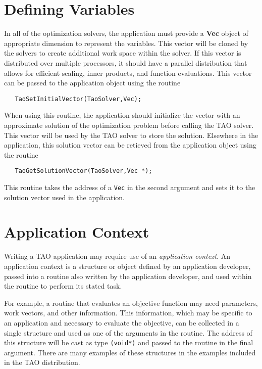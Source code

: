 \section{Defining Variables}
In all of the optimization solvers, the application must provide
a {\bf Vec} object of appropriate dimension to represent the variables.
This vector will be cloned by the solvers to create additional work
space within the solver.
If this vector is distributed over multiple processors, it
should have a parallel distribution that allows
for efficient scaling, inner products, and
function evaluations.  This vector can be passed to the
application object using the routine 
\begin{verbatim}
   TaoSetInitialVector(TaoSolver,Vec);
\end{verbatim}
When using this routine, the application should initialize the vector with
an approximate solution of the optimization problem before calling the
TAO solver.
This vector will be used by the TAO solver to store the solution.
Elsewhere in the application, 
this solution vector can be retieved from the application object 
using the routine 
\begin{verbatim}
   TaoGetSolutionVector(TaoSolver,Vec *);
\end{verbatim}
This routine takes the address of a {\tt Vec} in the second argument and sets it to
the solution vector used in the application.

\section{Application Context}  
Writing a TAO application may require
use of an {\em application context}.
An application context is a structure or object defined by an
application developer, passed
into a routine also written by the application developer, 
and used within the routine to perform its stated task.
 
For example, a routine that evaluates an objective function may need
parameters, work vectors, and other information.   This information,
which may be specific to an application and necessary to evaluate the objective,
can be collected in a single structure and used as one of the
arguments in the routine.
The address of this structure will be cast as type {\tt (void*)} and passed to
the routine in the final argument.
There are many examples of these structures in the examples included in the
TAO distribution.

